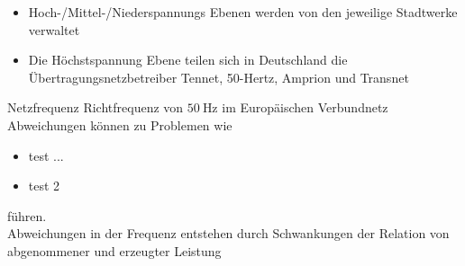 \documentclass[aspectratio=1610, professionalfonts, 9pt]{beamer}
\begin{document}
\begin{frame}
  \begin{itemize}
    \item Hoch-/Mittel-/Niederspannungs Ebenen
     werden von den jeweilige Stadtwerke verwaltet
    \item Die Höchstspannung Ebene teilen sich in Deutschland die Übertragungsnetzbetreiber Tennet, 50-Hertz, Amprion und Transnet
  \end{itemize}
\end{frame}

\begin{frame}{Netzfrequenz}
Richtfrequenz von $\SI{50}{\hertz}$ im Europäischen Verbundnetz
Abweichungen können zu Problemen wie
\begin{itemize}[<+->]
  \item test ...
  \item test 2
\end{itemize}
führen.\\
Abweichungen in der Frequenz entstehen durch Schwankungen der Relation von abgenommener und erzeugter Leistung

\end{frame}
\end{document}
